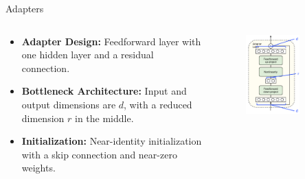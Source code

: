 \documentclass[serif, aspectratio=169]{beamer}
\begin{document}
\begin{frame}{Adapters}
    \begin{columns} %

        \begin{column}{0.5\textwidth}
            \begin{itemize}
                \item  
                    \textbf{Adapter Design: }
                     Feedforward layer with one hidden layer and a residual connection.
                    \vspace{0.3cm}
                \item  
                    \textbf{Bottleneck Architecture: }
                     Input and output dimensions are $d$, with a reduced dimension $r$ in the middle.
                    \vspace{0.3cm}
                \item  
                    \textbf{Initialization: }
                     Near-identity initialization with a skip connection and near-zero weights.
                    \vspace{0.3cm}
            \end{itemize}
        \end{column}

        \begin{column}{0.5\textwidth}
            \begin{figure}
                \centering
                \includegraphics[width=0.68\textwidth]{pic/Adaptor 2.PNG}
            \end{figure}
        \end{column}

    \end{columns}
\end{frame}
\end{document}
